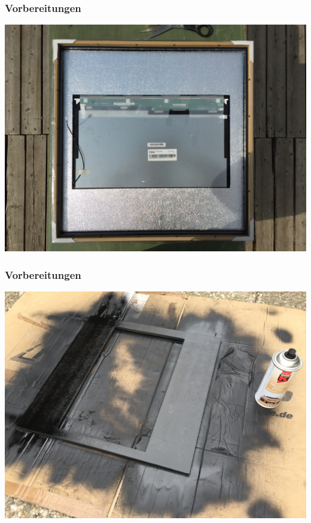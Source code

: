 \documentclass[11pt]{beamer}
\begin{document}
	\begin{frame}
		\frametitle{Vorbereitungen}
		\begin{center}
			\includegraphics[scale=0.07]{images/20170603135112066iOS.jpg}
		\end{center}
	\end{frame}
	
	\begin{frame}
		\frametitle{Vorbereitungen}
		\begin{center}
			\includegraphics[scale=0.07]{images/20170603173636215iOS.jpg}
		\end{center}
	\end{frame}
	
\end{document}
